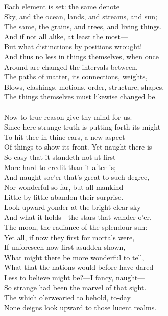 Each element is set: the same denote\\
Sky, and the ocean, lands, and streams, and sun;\\
The same, the grains, and trees, and living things.\\
And if not all alike, at least the most—\\
But what distinctions by positions wrought!\\
And thus no less in things themselves, when once\\
Around are changed the intervals between,\\
The paths of matter, its connections, weights,\\
Blows, clashings, motions, order, structure, shapes,\\
The things themselves must likewise changed be.\\
\\
Now to true reason give thy mind for us.\\
Since here strange truth is putting forth its might\\
To hit thee in thine ears, a new aspect\\
Of things to show its front. Yet naught there is\\
So easy that it standeth not at first\\
More hard to credit than it after is;\\
And naught soe'er that's great to such degree,\\
Nor wonderful so far, but all mankind\\
Little by little abandon their surprise.\\
Look upward yonder at the bright clear sky\\
And what it holds—the stars that wander o'er,\\
The moon, the radiance of the splendour-sun:\\
Yet all, if now they first for mortals were,\\
If unforeseen now first asudden shown,\\
What might there be more wonderful to tell,\\
What that the nations would before have dared\\
Less to believe might be?—I fancy, naught—\\
So strange had been the marvel of that sight.\\
The which o'erwearied to behold, to-day\\
None deigns look upward to those lucent realms.\\
